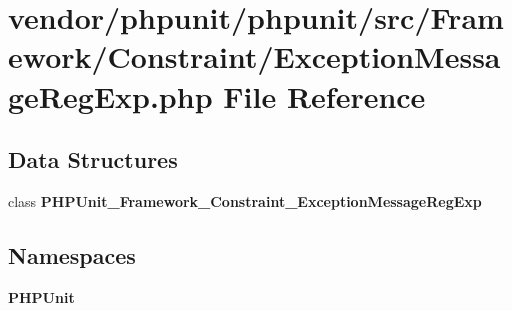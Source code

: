 \section{vendor/phpunit/phpunit/src/\+Framework/\+Constraint/\+Exception\+Message\+Reg\+Exp.php File Reference}
\label{_exception_message_reg_exp_8php}
\subsection*{Data Structures}
\begin{DoxyCompactItemize}
\item 
class {\bf P\+H\+P\+Unit\+\_\+\+Framework\+\_\+\+Constraint\+\_\+\+Exception\+Message\+Reg\+Exp}
\end{DoxyCompactItemize}
\subsection*{Namespaces}
\begin{DoxyCompactItemize}
\item 
 {\bf P\+H\+P\+Unit}
\end{DoxyCompactItemize}

